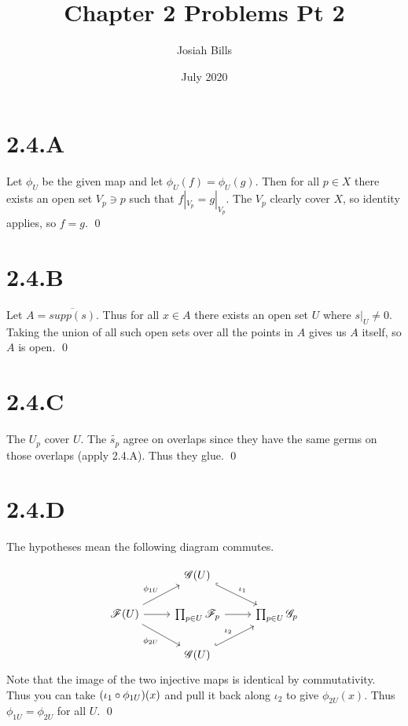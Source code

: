\documentclass{article}
\title{Chapter 2 Problems Pt 2}
\author{Josiah Bills}
\date{July 2020}
\begin{document}
\maketitle

\section*{2.4.A}
Let $\phi_U$ be the given map and let $\phi_U(f)=\phi_U(g)$.
Then for all $p \in X$ there exists an open set
$V_p \ni p$ such that $f|_{V_p}=g|_{V_p}$. The
$V_p$ clearly cover $X$, so identity
applies, so $f=g$. \qed

\section*{2.4.B}
Let $A=\overline{supp(s)}$. Thus for all $x \in A$ there exists an
open set $U$ where $s|_U \not = 0$. Taking the union
of all such open sets over all the points in $A$ gives us
$A$ itself, so $A$ is open. \qed

\section*{2.4.C}
The $U_p$ cover $U$. The
$\widetilde{s_p}$ agree on overlaps since they have the same germs on
those overlaps (apply 2.4.A). Thus they glue. \qed

\section*{2.4.D}
The hypotheses mean the following diagram commutes.

\[
    \begin{tikzcd}
                                                                              & \mathscr{G}(U) \ar[dr, hook, "\iota_1"] \\
        \mathscr{F}(U) \ar[r] \ar[ur, "\phi_{1U}"] \ar[dr, swap, "\phi_{2U}"] &
        \prod_{p \in U} \mathscr{F}_p \ar[r]
                                                                              & \prod_{p \in U} \mathscr{G}_p           \\
                                                                              & \mathscr{G}(U) \ar[ur, hook, "\iota_2"]
    \end{tikzcd}
\]
Note that the image of the two injective maps is identical by commutativity.
Thus you can take $(\iota_1 \circ \phi_{1U})(x)$ and pull it back along
$\iota_2$ to give $\phi_{2U}(x)$. Thus
$\phi_{1U}=\phi_{2U}$ for all $U$. \qed
\end{document}
